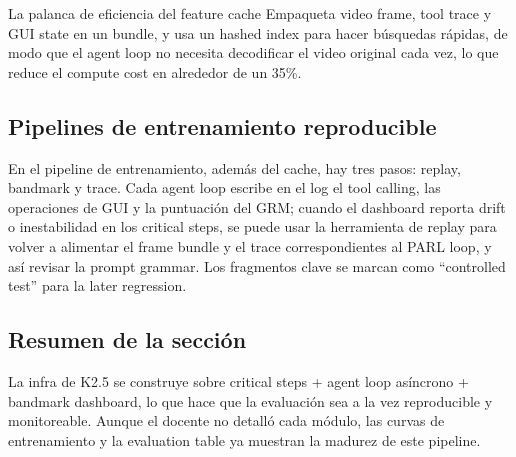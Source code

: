 \begin{importantbox}{La palanca de eficiencia del feature cache}
Empaqueta video frame, tool trace y GUI state en un bundle, y usa un hashed index para hacer búsquedas rápidas, de modo que el agent loop no necesita decodificar el video original cada vez, lo que reduce el compute cost en alrededor de un 35\%.
\end{importantbox}

\subsection{Pipelines de entrenamiento reproducible}
En el pipeline de entrenamiento, además del cache, hay tres pasos: replay, bandmark y trace. Cada agent loop escribe en el log el tool calling, las operaciones de GUI y la puntuación del GRM; cuando el dashboard reporta drift o inestabilidad en los critical steps, se puede usar la herramienta de replay para volver a alimentar el frame bundle y el trace correspondientes al PARL loop, y así revisar la prompt grammar. Los fragmentos clave se marcan como ``controlled test'' para la later regression.

\subsection{Resumen de la sección}
La infra de K2.5 se construye sobre critical steps + agent loop asíncrono + bandmark dashboard, lo que hace que la evaluación sea a la vez reproducible y monitoreable. Aunque el docente no detalló cada módulo, las curvas de entrenamiento y la evaluation table ya muestran la madurez de este pipeline.
